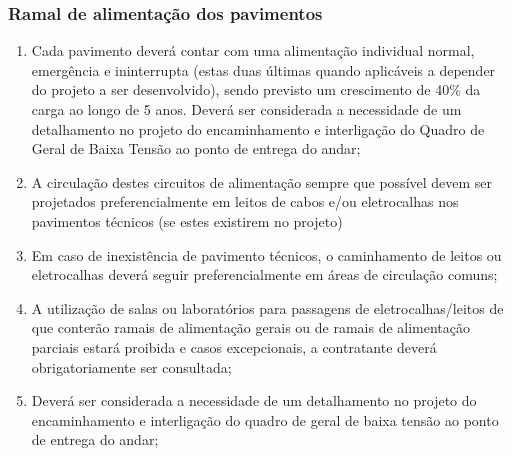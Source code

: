 \subsubsection{Ramal de alimentação dos pavimentos}

\begin{enumerate}
	\item Cada pavimento deverá contar com uma alimentação individual normal, emergência e ininterrupta (estas duas últimas quando aplicáveis a depender do projeto a ser desenvolvido), sendo previsto um crescimento de 40\% da carga ao longo de 5 anos. Deverá ser considerada a necessidade de um detalhamento no projeto do encaminhamento e interligação do Quadro de Geral de Baixa Tensão ao ponto de entrega do andar;
	
	\item A circulação destes circuitos de alimentação sempre que possível devem ser projetados preferencialmente em leitos de cabos e/ou eletrocalhas nos pavimentos técnicos (se estes existirem no projeto)
	
	\item Em caso de inexistência de pavimento técnicos, o caminhamento de leitos ou eletrocalhas deverá seguir preferencialmente em áreas de circulação comuns;
	
	\item A utilização de salas ou laboratórios para passagens de eletrocalhas/leitos de que conterão ramais de alimentação gerais ou de ramais de alimentação parciais estará proibida e casos excepcionais, a contratante deverá obrigatoriamente ser consultada;
	
	\item Deverá ser considerada a necessidade de um detalhamento no projeto do encaminhamento e interligação do quadro de geral de baixa tensão ao ponto de entrega do andar;

\end{enumerate}